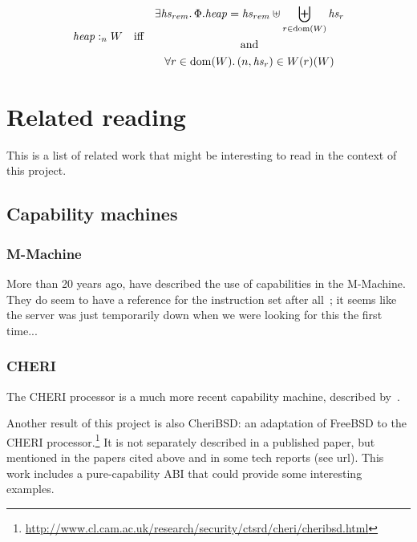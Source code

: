 \documentclass{article}
\DeclareMathOperator{\dom}{dom}
\newcommand{\var}[1]{\mathit{#1}}
\newcommand{\heapseg}{\var{hs}}
\newcommand{\heap}{\var{heap}}
\newcommand{\heapSat}[3][\heap]{#1 :_{#2} #3}
\newcommand{\npair}[2][n]{\left(#1,#2 \right)}
\begin{document}
\begin{definition}
\begin{align*}
  \heapSat{n}{W} & & \text{iff} & &
                                \begin{gathered}
\exists \heapseg_{rem} \ldotp \Phi.\heap = \heapseg_{rem} \uplus \biguplus_{r\in \dom(W)} \heapseg_r\\
\text{and}\\
\forall r \in \dom(W) \ldotp \npair{\heapseg_r} \in W(r)(W)
\end{gathered}
\end{align*}
\end{definition}
\section{Related reading}
\label{sec:related-reading}

This is a list of related work that might be interesting to read in the context
of this project.

\subsection{Capability machines}
\label{sec:rw-cap-machines}

\subsubsection{M-Machine}
More than 20 years ago, \cite{Carter:1994:HSF:195473.195579} have described the
use of capabilities in the M-Machine. They do seem to have a reference for the
instruction set after all~\citep{Dally1997Memo59}; it seems like the server was
just temporarily down when we were looking for this the first time...

\subsubsection{CHERI}

The CHERI processor is a much more recent capability machine, described
by~\cite{Woodruff:2014:CCM:2665671.2665740,Watson2015Cheri}.

Another result of this project is also CheriBSD: an adaptation of FreeBSD to the
CHERI
processor.\footnote{\url{http://www.cl.cam.ac.uk/research/security/ctsrd/cheri/cheribsd.html}}
It is not separately described in a published paper, but mentioned in the papers
cited above and in some tech reports (see url). This work includes a
pure-capability ABI that could provide some interesting examples.
\end{document}
